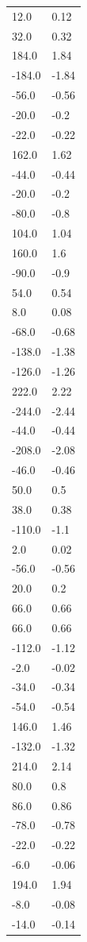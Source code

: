 \begin{longtable}{ll}
12.0 & 0.12 \\
32.0 & 0.32 \\
184.0 & 1.84 \\
-184.0 & -1.84 \\
-56.0 & -0.56 \\
-20.0 & -0.2 \\
-22.0 & -0.22 \\
162.0 & 1.62 \\
-44.0 & -0.44 \\
-20.0 & -0.2 \\
-80.0 & -0.8 \\
104.0 & 1.04 \\
160.0 & 1.6 \\
-90.0 & -0.9 \\
54.0 & 0.54 \\
8.0 & 0.08 \\
-68.0 & -0.68 \\
-138.0 & -1.38 \\
-126.0 & -1.26 \\
222.0 & 2.22 \\
-244.0 & -2.44 \\
-44.0 & -0.44 \\
-208.0 & -2.08 \\
-46.0 & -0.46 \\
50.0 & 0.5 \\
38.0 & 0.38 \\
-110.0 & -1.1 \\
2.0 & 0.02 \\
-56.0 & -0.56 \\
20.0 & 0.2 \\
66.0 & 0.66 \\
66.0 & 0.66 \\
-112.0 & -1.12 \\
-2.0 & -0.02 \\
-34.0 & -0.34 \\
-54.0 & -0.54 \\
146.0 & 1.46 \\
-132.0 & -1.32 \\
214.0 & 2.14 \\
80.0 & 0.8 \\
86.0 & 0.86 \\
-78.0 & -0.78 \\
-22.0 & -0.22 \\
-6.0 & -0.06 \\
194.0 & 1.94 \\
-8.0 & -0.08 \\
-14.0 & -0.14 \\

\end{longtable}
